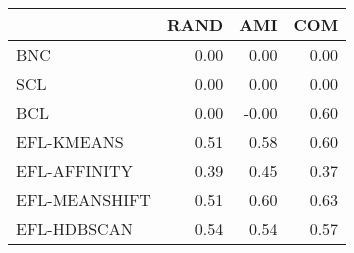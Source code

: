 \begin{tabular}{lrrr}
\toprule
 & RAND & AMI & COM \\
\midrule
BNC & 0.00 & 0.00 & 0.00 \\
SCL & 0.00 & 0.00 & 0.00 \\
BCL & 0.00 & -0.00 & 0.60 \\
EFL-KMEANS & 0.51 & 0.58 & 0.60 \\
EFL-AFFINITY & 0.39 & 0.45 & 0.37 \\
EFL-MEANSHIFT & 0.51 & 0.60 & 0.63 \\
EFL-HDBSCAN & 0.54 & 0.54 & 0.57 \\
\bottomrule
\end{tabular}
